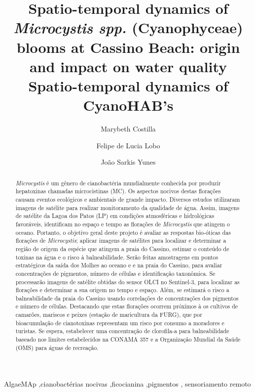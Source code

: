 \documentclass[
  super,
  preprint,
  3p]{elsarticle}
\begin{document}
\begin{frontmatter}
\title{Spatio-temporal dynamics of \emph{Microcystis spp.}
(Cyanophyceae) blooms at Cassino Beach: origin and impact on water
quality \\\large{Spatio-temporal dynamics of CyanoHAB's} }
\author[1]{Marybeth Costilla%
%
}
\author[2]{Felipe de Lucia Lobo%
%
}
\author[1]{João Sarkis Yunes%
%
}




        
\begin{abstract}
\emph{Microcystis} é um gênero de cianobactéria mundialmente conhecida
por produzir hepatoxinas chamadas microcistinas (MC). Os aspectos
nocivos destas florações causam eventos ecológicos e ambientais de
grande impacto. Diversos estudos utilizaram imagens de satélite para
realizar monitoramento da qualidade de água. Assim, imagens de satélite
da Lagoa dos Patos (LP) em condições atmosféricas e hidrológicas
favoráveis, identificam no espaço e tempo as florações de
\emph{Microcystis} que atingem o oceano. Portanto, o objetivo geral
deste projeto é avaliar as respostas bio-óticas das florações de
\emph{Microcystis}; aplicar imagens de satélites para localizar e
determinar a região de origem da espécie que atingem a praia do Cassino,
estimar o conteúdo de toxinas na água e o risco à balneabilidade. Serão
feitas amostragens em pontos estratégicos da saída dos Molhes ao oceano
e e na praia do Cassino, para avaliar concentrações de pigmentos, número
de células e identificação taxonômica. Se processarão imagens de
satélite obtidas do sensor OLCI no Sentinel-3, para localizar as
florações e determinar a sua origem no tempo e espaço. Além, se estimará
o risco a balneabilidade da praia do Cassino usando correlações de
concentrações dos pigmentos e número de células. Destacando que estas
florações ocorrem próximos à os cultivos de camarões, mariscos e peixes
(estação de maricultura da FURG), que por bioacumulação de cianotoxinas
representam um risco por consumo a moradores e turistas. Se espera,
estabelecer uma concentração de clorofila-a para balneabilidade baseado
nos limites estabelecidos na CONAMA 357 e a Organização Mundial da Saúde
(OMS) para águas de recreação.
\end{abstract}





\begin{keyword}
    AlgaeMAp \sep cianobactérias
nocivas \sep ficocianina \sep pigmentos \sep 
    sensoriamento remoto
\end{keyword}
\end{frontmatter}
\end{document}
